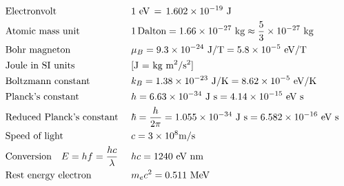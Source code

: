 \documentclass{article}[a4paper]
\begin{document}
\begin{minipage}[t]{0.5\textwidth}
\begin{align*}
    &\textrm{Electronvolt}         & ~&1\,\,\textrm{eV}\, = \,1.602\times 10^{-19} ~\textrm{J}\\
    &\textrm{Atomic mass unit}     & ~&1\,\textrm{Dalton} = 1.66 \times 10^{-27}~\textrm{kg} \approx \frac{5}{3} \times 10^{-27}~\textrm{kg}\\
    &\textrm{Bohr magneton}        & ~&\mu_B = 9.3 \times 10^{-24}~\textrm{J/T} = 5.8 \times 10^{-5}~\textrm{eV/T}\\
    &\textrm{Joule in SI units}    & ~&\textrm{[J = kg m$^2$/s$^2$]}\\
    &\textrm{Boltzmann constant}   & ~&k_B = 1.38 \times 10^{-23}~\textrm{J/K} = 8.62 \times 10^{-5}~\textrm{eV/K}\\
    &\textrm{Planck's constant}    & ~&h = 6.63 \times 10^{-34}~\textrm{J s} = 4.14 \times 10^{-15}~\textrm{eV s}\\
    &\textrm{Reduced Planck's constant} & ~&\hbar = \frac{h}{2\pi} = 1.055 \times 10^{-34}~\textrm{J s} = 6.582 \times 10^{-16}~\textrm{eV s}\\
    &\textrm{Speed of light}       & ~&c = 3\times 10^8 \textrm{m/s}\\
    &\textrm{Conversion\quad} E = hf = \frac{h c}{\lambda} & ~&hc = 1240~\textrm{eV nm}\\
    &\textrm{Rest energy electron} & ~&m_e c^2 = 0.511~\textrm{MeV}\\
  \end{align*}
\end{minipage}%
%
\newpage
%
\end{document}
